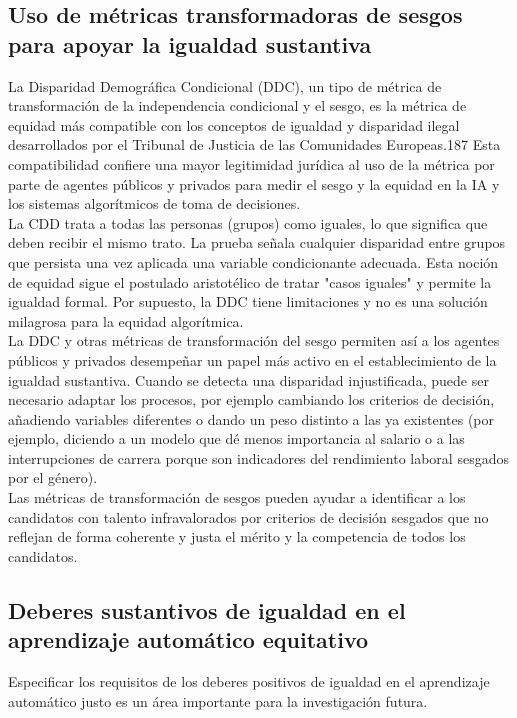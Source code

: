 \subsection{Uso de métricas transformadoras de sesgos para apoyar la igualdad sustantiva}
La Disparidad Demográfica Condicional (DDC), un tipo de métrica de transformación de la independencia condicional y el sesgo, es la métrica de equidad más compatible con los conceptos de igualdad y disparidad ilegal desarrollados por el Tribunal de Justicia de las Comunidades Europeas.187 Esta compatibilidad confiere una mayor legitimidad jurídica al uso de la métrica por parte de agentes públicos y privados para medir el sesgo y la equidad en la IA y los sistemas algorítmicos de toma de decisiones.\\

La CDD trata a todas las personas (grupos) como iguales, lo que significa que deben recibir el mismo trato. La prueba señala cualquier disparidad entre grupos que persista una vez aplicada una variable condicionante adecuada. Esta noción de equidad sigue el postulado aristotélico de tratar "casos iguales" y permite la igualdad formal. Por supuesto, la DDC tiene limitaciones y no es una solución milagrosa para la equidad algorítmica.\\

La DDC y otras métricas de transformación del sesgo permiten así a los agentes públicos y privados desempeñar un papel más activo en el establecimiento de la igualdad sustantiva. Cuando se detecta una disparidad injustificada, puede ser necesario adaptar los procesos, por ejemplo cambiando los criterios de decisión, añadiendo variables diferentes o dando un peso distinto a las ya existentes (por ejemplo, diciendo a un modelo que dé menos importancia al salario o a las interrupciones de carrera porque son indicadores del rendimiento laboral sesgados por el género).\\

Las métricas de transformación de sesgos pueden ayudar a identificar a los candidatos con talento infravalorados por criterios de decisión sesgados que no reflejan de forma coherente y justa el mérito y la competencia de todos los candidatos.

\subsection{Deberes sustantivos de igualdad en el aprendizaje automático equitativo}
Especificar los requisitos de los deberes positivos de igualdad en el aprendizaje automático justo es un área importante para la investigación futura.\\

